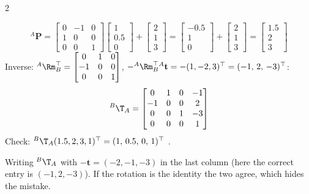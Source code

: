 \begin{multicols}{2}
\begin{worked}
\[{}^A\mathbf P=\begin{bmatrix}0&-1&0\\1&0&0\\0&0&1\end{bmatrix}\begin{bmatrix}1\\0.5\\0\end{bmatrix}+\begin{bmatrix}2\\1\\3\end{bmatrix}=\begin{bmatrix}-0.5\\1\\0\end{bmatrix}+\begin{bmatrix}2\\1\\3\end{bmatrix}=\begin{bmatrix}1.5\\2\\3\end{bmatrix}\]
Inverse: ${}^A\Rm_B^\top=\begin{bmatrix}0&1&0\\-1&0&0\\0&0&1\end{bmatrix}$, $-{}^A\Rm_B^\top{}^A\mathbf t=-(1,-2,3)^\top=(-1,\,2,\,-3)^\top$:
\[{}^B\T_A=\begin{bmatrix}0&1&0&-1\\-1&0&0&2\\0&0&1&-3\\0&0&0&1\end{bmatrix}\]
Check: ${}^B\T_A(1.5,2,3,1)^\top=(1,\,0.5,\,0,\,1)^\top$ \checkmark. \chk
\end{worked}
\begin{trap}
Writing ${}^B\T_A$ with $-\mathbf t=(-2,-1,-3)$ in the last column (here the correct entry is $(-1,2,-3)$). If the rotation is the identity the two agree, which hides the mistake.
\end{trap}


\end{multicols}
